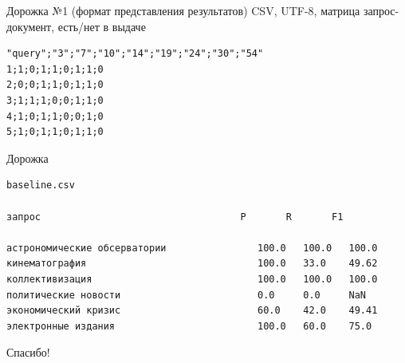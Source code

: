 \documentclass{beamer}
\begin{document}
\begin{frame}[fragile]{Дорожка №1 (формат представления результатов)}
CSV, UTF-8, матрица запрос-документ, есть/нет в выдаче
\begin{footnotesize}
\begin{verbatim}
"query";"3";"7";"10";"14";"19";"24";"30";"54"
1;1;0;1;1;0;1;1;0
2;0;0;1;1;0;1;1;0
3;1;1;1;0;0;1;1;0
4;1;0;1;1;0;0;1;0
5;1;0;1;1;0;1;1;0
\end{verbatim}
\end{footnotesize}
\end{frame}

\begin{frame}[fragile]{Дорожка}
\begin{scriptsize}
\begin{verbatim}
baseline.csv

запрос                                   P       R       F1

астрономические обсерватории            	100.0	100.0	100.0
кинематография                          	100.0	33.0 	49.62
коллективизация                         	100.0	100.0	100.0
политические новости                    	0.0  	0.0  	NaN
экономический кризис                    	60.0 	42.0 	49.41
электронные издания                     	100.0	60.0 	75.0
\end{verbatim}
\end{scriptsize}
\end{frame}

\begin{frame}{}
    \thispagestyle{empty}
    \begin{center}
        {\large Спасибо!}
    \end{center}
\end{frame}
\end{document}
